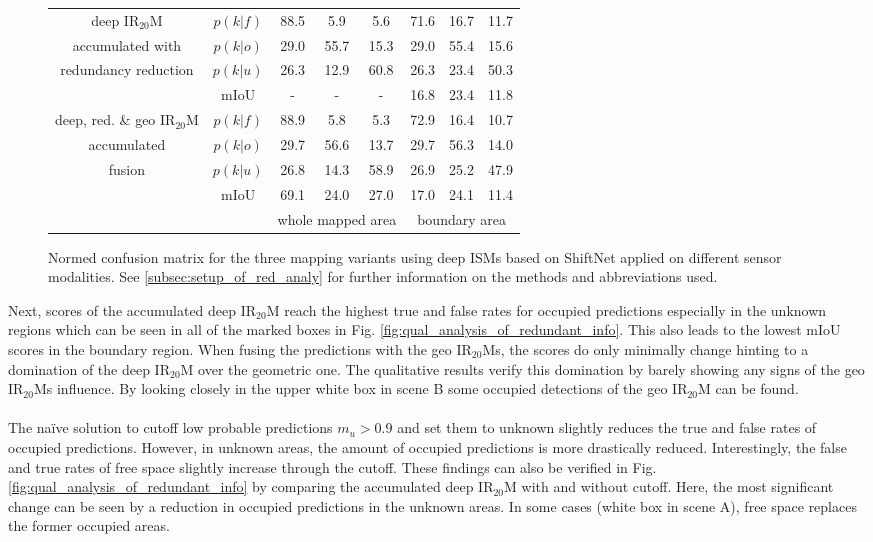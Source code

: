 \begin{figure}[H]
\begin{center}
{\begin{tabular}{c|c|ccc|ccc}
			\hline
			deep IR$_{20}$M &$p(k|f)$ & \textcolor{mygreen}{88.5} & \textcolor{myred}{5.9} & 5.6& \textcolor{mygreen}{71.6} & \textcolor{myred}{16.7} & 11.7 \\
			accumulated with &$p(k|o)$ & \textcolor{myred}{29.0} & \textcolor{mygreen}{55.7} & 15.3& \textcolor{myred}{29.0} & \textcolor{mygreen}{55.4} & 15.6 \\
			redundancy reduction &$p(k|u)$ & 26.3 & 12.9 & 60.8& 26.3 & 23.4 & 50.3 \\
			& mIoU & - & - & - &16.8&23.4&11.8 \\
			\hline
			deep, red. \& geo IR$_{20}$M  &$p(k|f)$ & \textcolor{mygreen}{88.9} & \textcolor{myred}{5.8} & 5.3& \textcolor{mygreen}{72.9} & \textcolor{myred}{16.4} & 10.7 \\
			accumulated&$p(k|o)$ & \textcolor{myred}{29.7} & \textcolor{mygreen}{56.6} & 13.7& \textcolor{myred}{29.7} & \textcolor{mygreen}{56.3} & 14.0 \\
			fusion&$p(k|u)$ & 26.8 & 14.3 & 58.9& 26.9 & 25.2 & 47.9 \\
			& mIoU &69.1&24.0&27.0&17.0&24.1&11.4 \\
			\hline
			& & \multicolumn{3}{c|}{\scriptsize{whole mapped area}} & \multicolumn{3}{c}{\scriptsize{boundary area}}
		\end{tabular}}
		\caption{\label{tab:conf_mat_redunt_info}Normed confusion matrix for the three mapping variants using deep ISMs based on ShiftNet applied on different sensor modalities. See \ref{subsec:setup_of_red_analy} for further information on the methods and abbreviations used.}
	\end{center}
\end{figure}
Next, scores of the accumulated deep IR$_{20}$M reach the highest true and false rates for occupied predictions especially in the unknown regions which can be seen in all of the marked boxes in Fig. \ref{fig:qual_analysis_of_redundant_info}. This also leads to the lowest mIoU scores in the boundary region. When fusing the predictions with the geo IR$_{20}$Ms, the scores do only minimally change hinting to a domination of the deep IR$_{20}$M over the geometric one. The qualitative results verify this domination by barely showing any signs of the geo IR$_{20}$Ms influence. By looking closely in the upper white box in scene B some occupied detections of the geo IR$_{20}$M can be found.
\\\\
The na\"ive solution to cutoff low probable predictions $m_u > 0.9$ and set them to unknown slightly reduces the true and false rates of occupied predictions. However, in unknown areas, the amount of occupied predictions is more drastically reduced. Interestingly, the false and true rates of free space slightly increase through the cutoff. These findings can also be verified in Fig. \ref{fig:qual_analysis_of_redundant_info} by comparing the accumulated deep IR$_{20}$M with and without cutoff. Here, the most significant change can be seen by a reduction in occupied predictions in the unknown areas. In some cases (white box in scene A), free space replaces the former occupied areas.
